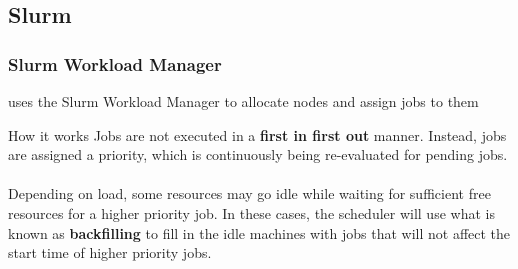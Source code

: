 \subsection{Slurm}
\begin{frame}
  \frametitle{Slurm Workload Manager}
  {\mana} uses the Slurm Workload Manager to allocate nodes and assign jobs to them
  
  \begin{block}{How it works}
    Jobs are not executed in a \textbf{first in first out} manner.  Instead, jobs are assigned a priority, which is continuously being re-evaluated for pending jobs.
    \\~\\Depending on load, some resources may go idle while waiting for sufficient free resources for a higher priority job.
    In these cases, the scheduler will use what is known as \textbf{backfilling} to fill in the idle machines with jobs that will not affect the start time of higher priority jobs.
	\end{block}
    
       
\end{frame}




